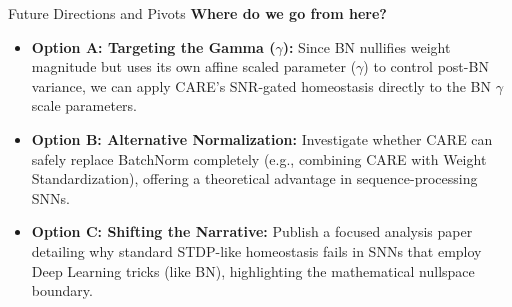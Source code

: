\documentclass[aspectratio=169]{beamer}
\begin{document}
\begin{frame}{Future Directions and Pivots}
    \textbf{Where do we go from here?}
    
    \begin{itemize}
        \item \textbf{Option A: Targeting the Gamma ($\gamma$):}
        Since BN nullifies weight magnitude but uses its own affine scaled parameter ($\gamma$) to control post-BN variance, we can apply CARE's SNR-gated homeostasis directly to the BN $\gamma$ scale parameters.
        
        \item \textbf{Option B: Alternative Normalization:}
        Investigate whether CARE can safely replace BatchNorm completely (e.g., combining CARE with Weight Standardization), offering a theoretical advantage in sequence-processing SNNs.
        
        \item \textbf{Option C: Shifting the Narrative:}
        Publish a focused analysis paper detailing why standard STDP-like homeostasis fails in SNNs that employ Deep Learning tricks (like BN), highlighting the mathematical nullspace boundary.
    \end{itemize}
\end{frame}
\end{document}
